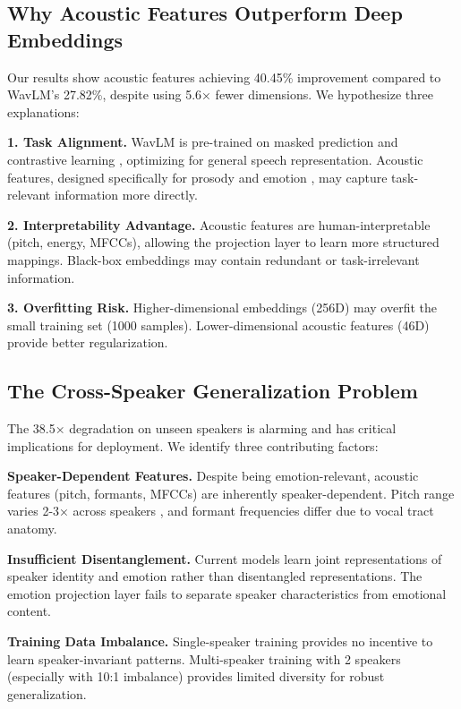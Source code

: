 \subsection{Why Acoustic Features Outperform Deep Embeddings}

Our results show acoustic features achieving 40.45\% improvement compared to WavLM's 27.82\%, despite using 5.6× fewer dimensions. We hypothesize three explanations:

\textbf{1. Task Alignment.} WavLM is pre-trained on masked prediction and contrastive learning \cite{chen2022wavlm}, optimizing for general speech representation. Acoustic features, designed specifically for prosody and emotion \cite{eyben2010opensmile}, may capture task-relevant information more directly.

\textbf{2. Interpretability Advantage.} Acoustic features are human-interpretable (pitch, energy, MFCCs), allowing the projection layer to learn more structured mappings. Black-box embeddings may contain redundant or task-irrelevant information.

\textbf{3. Overfitting Risk.} Higher-dimensional embeddings (256D) may overfit the small training set (1000 samples). Lower-dimensional acoustic features (46D) provide better regularization.

\subsection{The Cross-Speaker Generalization Problem}

The 38.5× degradation on unseen speakers is alarming and has critical implications for deployment. We identify three contributing factors:

\textbf{Speaker-Dependent Features.} Despite being emotion-relevant, acoustic features (pitch, formants, MFCCs) are inherently speaker-dependent. Pitch range varies 2-3× across speakers \cite{peterson1952control}, and formant frequencies differ due to vocal tract anatomy.

\textbf{Insufficient Disentanglement.} Current models learn joint representations of speaker identity and emotion rather than disentangled representations. The emotion projection layer fails to separate speaker characteristics from emotional content.

\textbf{Training Data Imbalance.} Single-speaker training provides no incentive to learn speaker-invariant patterns. Multi-speaker training with 2 speakers (especially with 10:1 imbalance) provides limited diversity for robust generalization.

